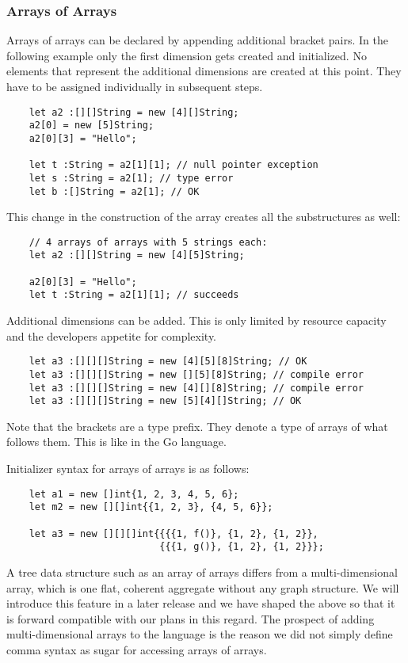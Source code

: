 \subsubsection{Arrays of Arrays}
Arrays of arrays can be declared by appending additional \code{[]} bracket
pairs. In the following example only the first dimension gets created
and initialized. No elements that represent the additional dimensions are
created at this point. They have to be assigned individually in subsequent
steps.
\begin{verbatim}
    let a2 :[][]String = new [4][]String;
    a2[0] = new [5]String;
    a2[0][3] = "Hello";

    let t :String = a2[1][1]; // null pointer exception
    let s :String = a2[1]; // type error
    let b :[]String = a2[1]; // OK
\end{verbatim}
This change in the construction of the array creates all the substructures as
well:
\begin{verbatim}
    // 4 arrays of arrays with 5 strings each:
    let a2 :[][]String = new [4][5]String;

    a2[0][3] = "Hello";
    let t :String = a2[1][1]; // succeeds
\end{verbatim}
Additional dimensions can be added. This is only limited by resource capacity
and the developers appetite for complexity.
\begin{verbatim}
    let a3 :[][][]String = new [4][5][8]String; // OK
    let a3 :[][][]String = new [][5][8]String; // compile error
    let a3 :[][][]String = new [4][][8]String; // compile error
    let a3 :[][][]String = new [5][4][]String; // OK
\end{verbatim}
Note that the brackets are a type prefix. They denote a type of arrays of what
follows them. This is like in the Go language.

Initializer syntax for arrays of arrays is as follows:
\begin{verbatim}
    let a1 = new []int{1, 2, 3, 4, 5, 6};
    let m2 = new [][]int{{1, 2, 3}, {4, 5, 6}};

    let a3 = new [][][]int{{{{1, f()}, {1, 2}, {1, 2}},
                           {{{1, g()}, {1, 2}, {1, 2}}};
\end{verbatim}

A tree data structure such as an array of arrays differs from a
multi-dimensional array, which is one flat, coherent aggregate without any graph
structure. We will introduce this feature in a later release and we have shaped
the above so that it is forward compatible with our plans in this regard. The
prospect of adding multi-dimensional arrays to the language is the reason we did
not simply define comma syntax as sugar for accessing arrays of arrays.

